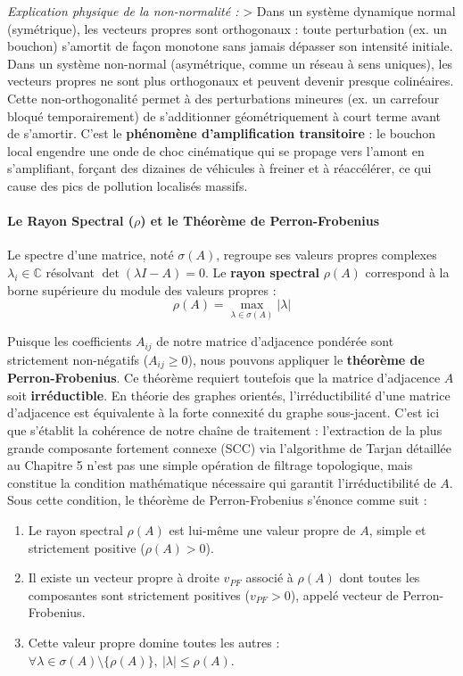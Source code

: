 \documentclass[10pt, a4paper]{article}
\providecommand{\tightlist}{}
\begin{document}
\emph{Explication physique de la non-normalité :} \textgreater{} Dans un
système dynamique normal (symétrique), les vecteurs propres sont
orthogonaux : toute perturbation (ex. un bouchon) s'amortit de façon
monotone sans jamais dépasser son intensité initiale. Dans un système
non-normal (asymétrique, comme un réseau à sens uniques), les vecteurs
propres ne sont plus orthogonaux et peuvent devenir presque colinéaires.
Cette non-orthogonalité permet à des perturbations mineures (ex. un
carrefour bloqué temporairement) de s'additionner géométriquement à
court terme avant de s'amortir. C'est le \textbf{phénomène
d'amplification transitoire} : le bouchon local engendre une onde de
choc cinématique qui se propage vers l'amont en s'amplifiant, forçant
des dizaines de véhicules à freiner et à réaccélérer, ce qui cause des
pics de pollution localisés massifs.

\paragraph{\texorpdfstring{Le Rayon Spectral (\(\rho\)) et le Théorème
de
Perron-Frobenius}{Le Rayon Spectral (\textbackslash rho) et le Théorème de Perron-Frobenius}}\label{le-rayon-spectral-rho-et-le-thuxe9oruxe8me-de-perron-frobenius}

Le spectre d'une matrice, noté \(\sigma(A)\), regroupe ses valeurs
propres complexes \(\lambda_i \in \mathbb{C}\) résolvant
\(\det(\lambda I - A) = 0\). Le \textbf{rayon spectral} \(\rho(A)\)
correspond à la borne supérieure du module des valeurs propres :
\[\rho(A) = \max_{\lambda \in \sigma(A)} |\lambda|\]

Puisque les coefficients \(A_{ij}\) de notre matrice d'adjacence
pondérée sont strictement non-négatifs (\(A_{ij} \ge 0\)), nous pouvons
appliquer le \textbf{théorème de Perron-Frobenius}. Ce théorème requiert
toutefois que la matrice d'adjacence \(A\) soit \textbf{irréductible}.
En théorie des graphes orientés, l'irréductibilité d'une matrice
d'adjacence est équivalente à la forte connexité du graphe sous-jacent.
C'est ici que s'établit la cohérence de notre chaîne de traitement :
l'extraction de la plus grande composante fortement connexe (SCC) via
l'algorithme de Tarjan détaillée au Chapitre 5 n'est pas une simple
opération de filtrage topologique, mais constitue la condition
mathématique nécessaire qui garantit l'irréductibilité de \(A\). Sous
cette condition, le théorème de Perron-Frobenius s'énonce comme suit :

\begin{enumerate}
\def\labelenumi{\arabic{enumi}.}
\tightlist
\item
  Le rayon spectral \(\rho(A)\) est lui-même une valeur propre de \(A\),
  simple et strictement positive (\(\rho(A) > 0\)).
\item
  Il existe un vecteur propre à droite \(v_{PF}\) associé à \(\rho(A)\)
  dont toutes les composantes sont strictement positives
  (\(v_{PF} > 0\)), appelé vecteur de Perron-Frobenius.
\item
  Cette valeur propre domine toutes les autres :
  \(\forall \lambda \in \sigma(A) \setminus \{\rho(A)\}, \ |\lambda| \le \rho(A)\).
\end{enumerate}
\end{document}
